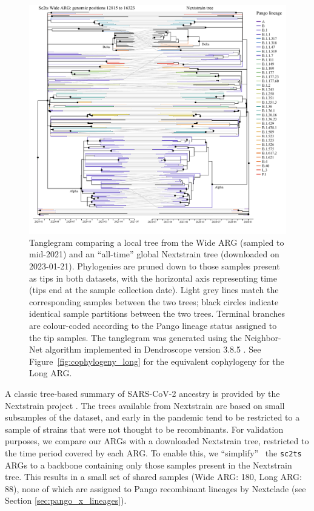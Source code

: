 \documentclass{article}
\begin{document}
\begin{figure} \centering
\includegraphics[width=\textwidth]{figures/cophylogeny_wide.pdf}
\caption{\label{fig:cophylogeny}
Tanglegram comparing a local tree from the Wide ARG
(sampled to mid-2021) and an ``all-time'' global Nextstrain tree
(downloaded on 2023-01-21).
Phylogenies are pruned down to those samples present as tips in both datasets, with the horizontal axis representing time (tips end at the sample collection date). Light grey
lines match the corresponding samples between the two trees; black circles
indicate identical sample partitions between the two trees. Terminal branches
are colour-coded according to the Pango lineage status assigned to the tip
samples.
The tanglegram was generated using the Neighbor-Net algorithm
\citep{Scornavacca2011-mg} implemented in Dendroscope version 3.8.5
\citep{Huson2012-ys}. See Figure~\ref{fig:cophylogeny_long} for the equivalent
cophylogeny for the Long ARG.}
\end{figure}

A classic tree-based summary of SARS-CoV-2 ancestry is provided
by the Nextstrain project \citep{Hadfield2018-ef}. The trees
available from Nextstrain are based on small subsamples of the
dataset, and early in the pandemic tend to be restricted to
a sample of strains that were not thought to be recombinants.
For validation purposes, we compare our ARGs with
a downloaded Nextstrain tree, restricted to the time period
covered by each ARG. To enable this, we ``simplify''~\citep{Kelleher2018-xc}
the \texttt{sc2ts} ARGs to a backbone containing only those samples
present in the Nextstrain tree. This results in a small set of shared
samples (Wide ARG: 180, Long ARG: 88), none of which are
assigned to Pango recombinant lineages by Nextclade (see Section
\ref{sec:pango_x_lineages}).
\end{document}
